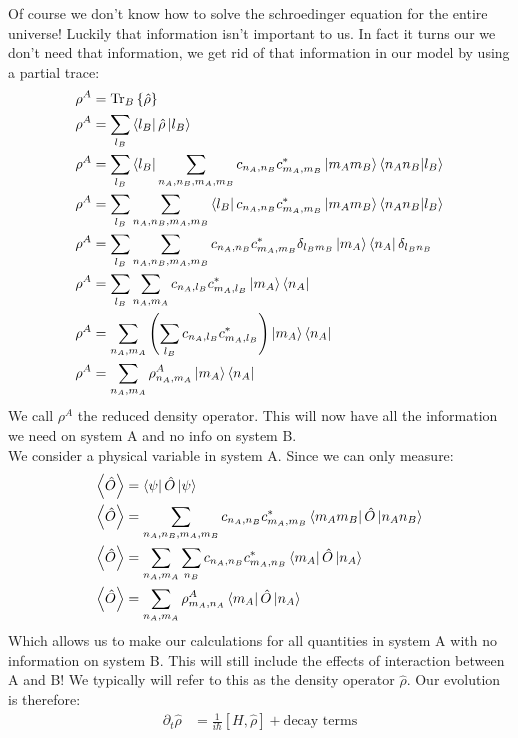 Of course we don't know how to solve the schroedinger equation for the entire universe! Luckily that information isn't important to us. In fact it turns our we don't need that information, we get rid of that information in our model by using a partial trace:
\begin{align*}
	\rho^A &= \Tr_B\left\{\hat{\rho}\right\} \\
	\rho^A &= \sum_{l_B} \bra{l_B}\hat{\rho}\ket{l_B} \\
	\rho^A &= \sum_{l_B} \bra{l_B}\sum_{n_A,n_B,m_A,m_B} c_{n_A,n_B}c_{m_A,m_B}^* \ket{m_Am_B}\bra{n_An_B}\ket{l_B} \\
	\rho^A &= \sum_{l_B} \sum_{n_A,n_B,m_A,m_B} \bra{l_B}c_{n_A,n_B}c_{m_A,m_B}^* \ket{m_Am_B}\bra{n_An_B}\ket{l_B} \\
	\rho^A &= \sum_{l_B} \sum_{n_A,n_B,m_A,m_B} c_{n_A,n_B}c_{m_A,m_B}^* \delta_{l_Bm_B}\ket{m_A}\bra{n_A}\delta_{l_Bn_B} \\
	\rho^A &= \sum_{l_B} \sum_{n_A,m_A} c_{n_A,l_B}c_{m_A,l_B}^* \ket{m_A}\bra{n_A} \\
	\rho^A &=  \sum_{n_A,m_A} \left(\sum_{l_B}c_{n_A,l_B}c_{m_A,l_B}^*\right) \ket{m_A}\bra{n_A} \\
	\rho^A &=  \sum_{n_A,m_A} \rho^A_{n_A,m_A} \ket{m_A}\bra{n_A}
\end{align*}
We call $\rho^A$ the reduced density operator. This will now have all the information we need on system A and no info on system B. \\
We consider a physical variable in system A. Since we can only measure:
\begin{align*}
	\expval{\hat{O}} &= \bra{\psi}\hat{O}\ket{\psi} \\
	\expval{\hat{O}} &= \sum_{n_A,n_B,m_A,m_B} c_{n_A,n_B}c_{m_A,m_B}^*\bra{m_Am_B}\hat{O}\ket{n_An_B} \\
	\expval{\hat{O}} &= \sum_{n_A,m_A} \sum_{n_B}c_{n_A,n_B}c_{m_A,n_B}^*\bra{m_A}\hat{O}\ket{n_A} \\
	\expval{\hat{O}} &= \sum_{n_A,m_A} \rho^A_{m_A,n_A}\bra{m_A}\hat{O}\ket{n_A}
\end{align*}
Which allows us to make our calculations for all quantities in system A with no information on system B. This will still include the effects of interaction between A and B! We typically will refer to this as the density operator $\hat{\rho}$. Our evolution is therefore:
\begin{align*}
	\partial_t \hat{\rho} &= \frac{1}{i\hbar}[H,\hat{\rho}] + \text{decay terms}
\end{align*}
